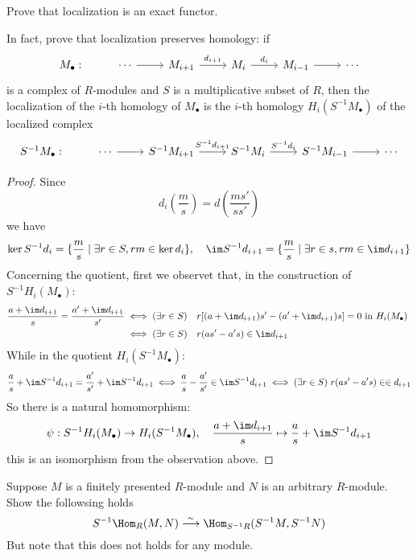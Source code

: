 \begin{exercise}\label{locali exact}
Prove that localization is an exact functor.\par
In fact, prove that localization preserves homology: if
\[\begin{tikzcd}
M_{\bullet}:&\cdots\ar[r]&M_{i+1}\ar[r,"d_{i+1}"]&M_i\ar[r,"d_i"]&M_{i-1}\ar[r]&\cdots
\end{tikzcd}\]
is a complex of $R$-modules and $S$ is a multiplicative subset of $R$, then the localization of the $i$-th homology of $M_{\bullet}$ is the $i$-th homology $H_i(S^{-1}M_{\bullet})$ of the localized complex
\[\begin{tikzcd}
S^{-1}M_{\bullet}:&\cdots\ar[r]&S^{-1}M_{i+1}\ar[r,"S^{-1}d_{i+1}"]&S^{-1}M_i\ar[r,"S^{-1}d_i"]&S^{-1}M_{i-1}\ar[r]&\cdots
\end{tikzcd}\]
\end{exercise}
\begin{proof}
Since 
\[d_i(\dfrac{m}{s})=d(\dfrac{ms'}{ss'})\]
we have
\[\ker S^{-1}d_i=\{\dfrac{m}{s}\mid \exists r\in S, rm\in\ker d_i\},\quad\im S^{-1}d_{i+1}=\{\dfrac{m}{s}\mid\exists r\in s, rm\in\im d_{i+1}\}\]
Concerning the quotient, first we observet that, in the construction of $S^{-1}H_i(M_{\bullet})$:
\begin{align*}
\dfrac{a+\im d_{i+1}}{s}=\dfrac{a'+\im d_{i+1}}{s'}&\iff (\exists r\in S)\quad r[(a+\im d_{i+1})s'-(a'+\im d_{i+1})s]=0\text{ in $H_i(M_{\bullet})$ }\\
&\iff (\exists r\in S)\quad r(as'-a's)\in\im d_{i+1}\end{align*}
While in the quotient $H_i(S^{-1}M_{\bullet})$:
\[\dfrac{a}{s}+\im S^{-1}d_{i+1}=\dfrac{a'}{s'}+\im S^{-1}d_{i+1}\iff \dfrac{a}{s}-\dfrac{a'}{s'}\in\im S^{-1}d_{i+1}\iff (\exists r\in S)\  r(as'-a's)\in\in d_{i+1}\]
So there is a natural homomorphism:
\[\psi:S^{-1}H_i(M_{\bullet})\to H_i(S^{-1}M_{\bullet}),\quad \dfrac{a+\im d_{i+1}}{s}\mapsto\dfrac{a}{s}+\im S^{-1}d_{i+1}\]
this is an isomorphism from the observation above.
\end{proof}
\begin{exercise}
Suppose $M$ is a finitely presented $R$-module and $N$ is an arbitrary $R$-module. Show the followsing holds
\[S^{-1}\Hom_R(M,N)\stackrel{\sim}{\longrightarrow}\Hom_{S^{-1}R}(S^{-1}M,S^{-1}N)\]
But note that this does not holds for any module.
\end{exercise}
